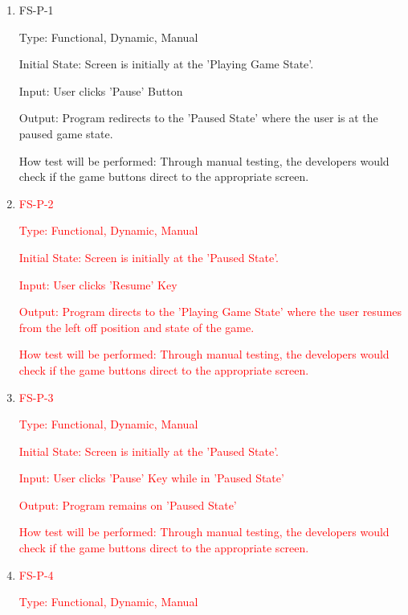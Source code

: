 \documentclass[12pt, titlepage]{article}
\begin{document}
\begin{enumerate}

\item{FS-P-1\\}

Type: Functional, Dynamic, Manual
					
Initial State: Screen is initially at the 'Playing Game State'.
					
Input: User clicks 'Pause' Button
					
Output: Program redirects to the 'Paused State' where the user is at the paused game state.
					
How test will be performed: Through manual testing, the developers would check if the game buttons direct to the appropriate screen.
					
\item\textcolor{red}{FS-P-2\\}

\textcolor{red}{Type: Functional, Dynamic, Manual}

\textcolor{red}{Initial State: Screen is initially at the 'Paused State'.}
					
\textcolor{red}{Input: User clicks 'Resume' Key}
					
\textcolor{red}{Output: Program directs to the 'Playing Game State' where the user resumes from the left off position and state of the game.}

\textcolor{red}{How test will be performed: Through manual testing, the developers would check if the game buttons direct to the appropriate screen.}

\item\textcolor{red}{FS-P-3\\}

\textcolor{red}{Type: Functional, Dynamic, Manual}

\textcolor{red}{Initial State: Screen is initially at the 'Paused State'.}
					
\textcolor{red}{Input: User clicks 'Pause' Key while in 'Paused State'}
					
\textcolor{red}{Output: Program remains on 'Paused State'}

\textcolor{red}{How test will be performed: Through manual testing, the developers would check if the game buttons direct to the appropriate screen.}

\item\textcolor{red}{FS-P-4\\}

\textcolor{red}{Type: Functional, Dynamic, Manual}


\end{enumerate}
\end{document}

